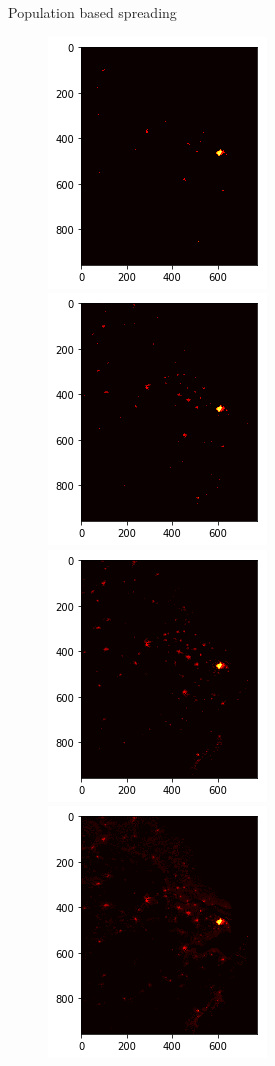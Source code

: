 \documentclass{beamer}
\begin{document}
\begin{frame}{Population based spreading}
  \begin{figure}
    \includegraphics[width = 0.34\linewidth]{pics/ntl/ntl_4.png}
    \includegraphics[width = 0.34\linewidth]{pics/ntl/ntl_3.png}
    \includegraphics[width = 0.34\linewidth]{pics/ntl/ntl_2.png}
    \includegraphics[width = 0.34\linewidth]{pics/ntl/ntl_1.png}
  \end{figure}
\end{frame}
\end{document}

